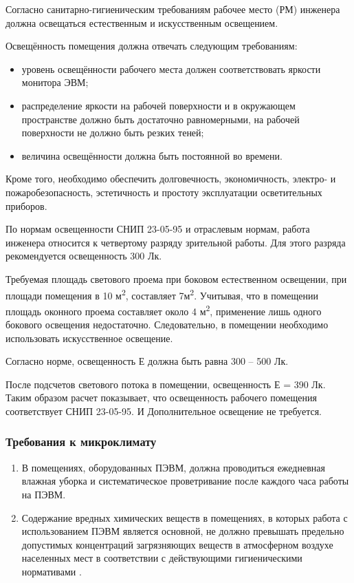 Согласно санитарно-гигиеническим требованиям рабочее место (РМ) инженера должна освещаться естественным и искусственным освещением.

Освещённость помещения должна отвечать следующим требованиям:

\begin{itemize}
 \item уровень освещённости рабочего места должен соответствовать яркости монитора ЭВМ;
 \item распределение яркости на рабочей поверхности и в окружающем пространстве должно быть достаточно равномерными, на рабочей поверхности не должно быть резких теней;
 \item величина освещённости должна быть постоянной во времени.
\end{itemize}

Кроме того, необходимо обеспечить долговечность, экономичность, электро- и пожаробезопасность, эстетичность и простоту эксплуатации осветительных приборов.

По нормам освещенности СНИП 23-05-95 и отраслевым нормам, работа инженера относится к четвертому разряду зрительной работы. Для этого разряда рекомендуется освещенность 300 Лк. 

Требуемая площадь светового проема при боковом естественном освещении, при площади помещения в 10 м\textsuperscript{2}, составляет 7м\textsuperscript{2}. Учитывая, что в помещении площадь оконного проема составляет около 4 м\textsuperscript{2}, применение лишь одного бокового освещения недостаточно. Следовательно, в помещении необходимо использовать искусственное освещение. 

Согласно норме, освещенность Е должна быть равна 300 – 500 Лк. 

После подсчетов светового потока в помещении, освещенность Е = 390 Лк. Таким образом расчет показывает, что освещенность рабочего помещения соответствует СНИП 23-05-95. И Дополнительное освещение не требуется.

\subsubsection{Требования к микроклимату}

\begin{enumerate}
 \item В помещениях, оборудованных ПЭВМ, должна проводиться ежедневная влажная уборка и систематическое проветривание после каждого часа работы на ПЭВМ.
 \item Содержание вредных химических веществ в помещениях, в которых работа с использованием ПЭВМ является основной, не должно превышать предельно допустимых концентраций загрязняющих веществ в атмосферном воздухе населенных мест в соответствии с действующими гигиеническими нормативами \cite{OT2}.
\end{enumerate}

